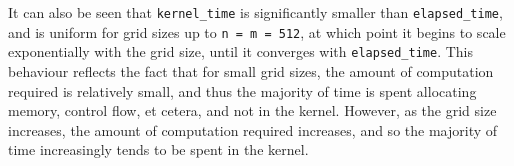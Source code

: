 \documentclass{article}
\begin{document}
It can also be seen that \lstinline{kernel_time} is significantly smaller than
\lstinline{elapsed_time}, and is uniform for grid sizes up to
\lstinline{n = m = 512}, at which point it begins to scale exponentially with
the grid size, until it converges with \lstinline{elapsed_time}.
This behaviour reflects the fact that for small grid sizes, the amount of
computation required is relatively small, and thus the majority of time
is spent allocating memory, control flow, et cetera, and not in the kernel.
However, as the grid size increases, the amount of computation required
increases, and so the majority of time increasingly tends to be spent in the
kernel.
\end{document}
